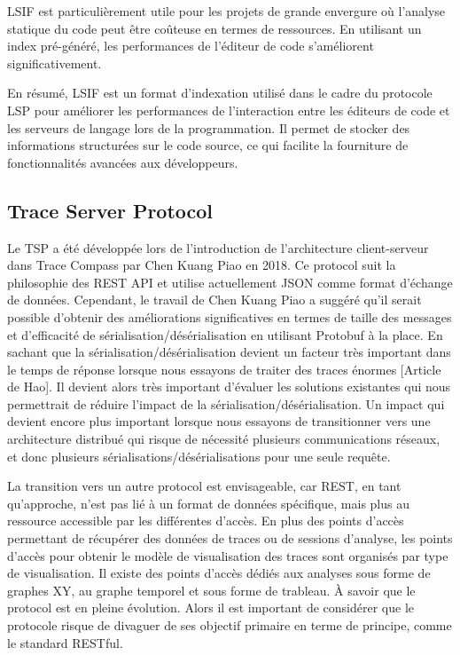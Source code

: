 LSIF est particulièrement utile pour les projets de grande envergure où l'analyse statique du code peut être coûteuse en termes de ressources. En utilisant un index pré-généré, les performances de l'éditeur de code s'améliorent significativement.

En résumé, LSIF est un format d'indexation utilisé dans le cadre du protocole LSP pour améliorer les performances de l'interaction entre les éditeurs de code et les serveurs de langage lors de la programmation. Il permet de stocker des informations structurées sur le code source, ce qui facilite la fourniture de fonctionnalités avancées aux développeurs.


\subsection{Trace Server Protocol}

Le TSP a été développée lors de l'introduction de l'architecture client-serveur dans Trace Compass par Chen Kuang Piao en 2018. Ce protocol suit la philosophie des REST API et utilise actuellement JSON comme format d'échange de données. Cependant, le travail de Chen Kuang Piao a suggéré qu'il serait possible d'obtenir des améliorations significatives en termes de taille des messages et d'efficacité de sérialisation/désérialisation en utilisant Protobuf à la place. En sachant que la sérialisation/désérialisation devient un facteur très important dans le temps de réponse lorsque nous essayons de traiter des traces énormes [Article de Hao]. Il devient alors très important d'évaluer les solutions existantes qui nous permettrait de réduire l'impact de la sérialisation/désérialisation. Un impact qui devient encore plus important lorsque nous essayons de transitionner vers une architecture distribué qui risque de nécessité plusieurs communications réseaux, et donc plusieurs sérialisations/désérialisations pour une seule requête. 

La transition vers un autre protocol est envisageable, car REST, en tant qu'approche, n'est pas lié à un format de données spécifique, mais plus au ressource accessible par les différentes d'accès. En plus des points d'accès permettant de récupérer des données de traces ou de sessions d'analyse, les points d'accès pour obtenir le modèle de visualisation des traces sont organisés par type de visualisation. Il existe des points d'accès dédiés aux analyses sous forme de graphes XY, au graphe temporel et sous forme de trableau. À savoir que le protocol est en pleine évolution. Alors il est important de considérer que le protocole risque de divaguer de ses objectif primaire en terme de principe, comme le standard RESTful. 

